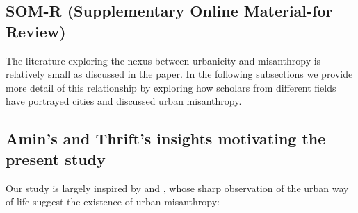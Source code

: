 \documentclass[11pt, letterpaper]{article}
\begin{document}
\begin{spacing}{1.4}





\clearpage

\section*{\LARGE SOM-R (Supplementary Online Material-for Review)}

The literature exploring the nexus between urbanicity and misanthropy is relatively small as discussed in the paper. In the following subsections we provide more detail of this relationship by exploring how scholars from different fields have portrayed cities and discussed urban misanthropy. 

\subsection{Amin's and Thrift's insights motivating the present study}

Our study is largely inspired by \citet{amin06} and \citet{thrift05}, whose sharp observation of
the urban way of life suggest the existence of urban misanthropy: 


\end{spacing}
\end{document}
